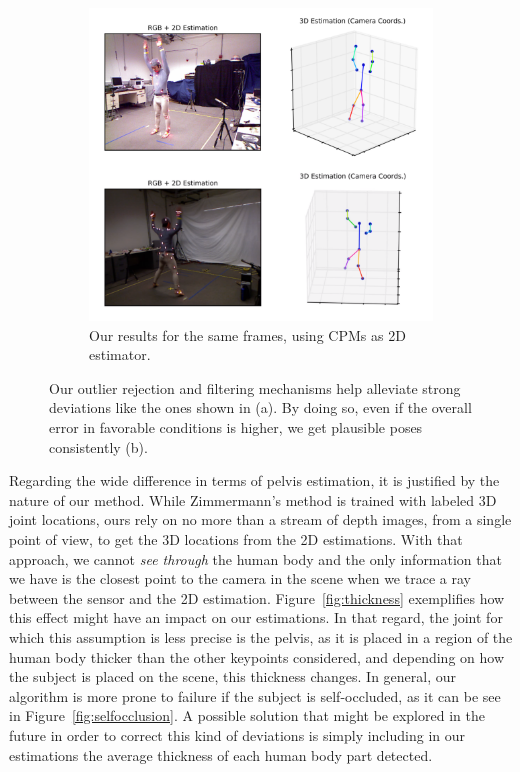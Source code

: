 \begin{figure}[h]
\begin{subfigure}{0.49\textwidth}
        \includegraphics[width=\textwidth]{figures/ours_right.png}
        \caption{Our results for the same frames, using CPMs as 2D estimator.}
        \label{subfig:ours_cpm_right}
    \end{subfigure}
    \caption{Our outlier rejection and filtering mechanisms help alleviate strong deviations like the ones shown in (a). By doing so, even if the overall error in favorable conditions is higher, we get plausible poses consistently (b).}
    \label{fig:zimmermann_failed}
\end{figure}

Regarding the wide difference in terms of pelvis estimation, it is justified by the nature of our method. While Zimmermann's method is trained with labeled 3D joint locations, ours rely on no more than a stream of depth images, from a single point of view, to get the 3D locations from the 2D estimations. With that approach, we cannot \textit{see through} the human body and the only information that we have is the closest point to the camera in the scene when we trace a ray between the sensor and the 2D estimation. Figure~\ref{fig:thickness} exemplifies how this effect might have an impact on our estimations. In that regard, the joint for which this assumption is less precise is the pelvis, as it is placed in a region of the human body thicker than the other keypoints considered, and depending on how the subject is placed on the scene, this thickness changes. In general, our algorithm is more prone to failure if the subject is self-occluded, as it can be see in Figure~\ref{fig:selfocclusion}. A possible solution that might be explored in the future in order to correct this kind of deviations is simply including in our estimations the average thickness of each human body part detected.


